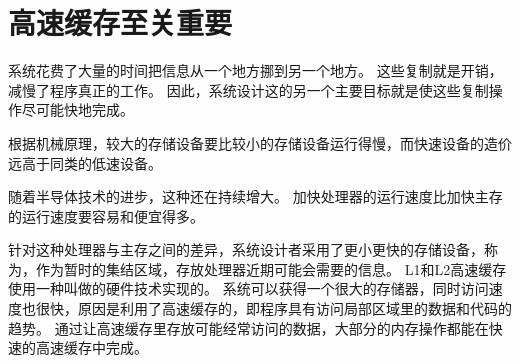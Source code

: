 
\section{高速缓存至关重要}
{
    系统花费了大量的时间把信息从一个地方挪到另一个地方。
    这些复制就是开销，减慢了程序真正的工作。
    因此，系统设计这的另一个主要目标就是使这些复制操作尽可能快地完成。

    根据机械原理，较大的存储设备要比较小的存储设备运行得慢，而快速设备的造价远高于同类的低速设备。

    随着半导体技术的进步，这种还在持续增大。
    加快处理器的运行速度比加快主存的运行速度要容易和便宜得多。

    针对这种处理器与主存之间的差异，系统设计者采用了更小更快的存储设备，称为，作为暂时的集结区域，存放处理器近期可能会需要的信息。
    L1和L2高速缓存使用一种叫做的硬件技术实现的。
    系统可以获得一个很大的存储器，同时访问速度也很快，原因是利用了高速缓存的，即程序具有访问局部区域里的数据和代码的趋势。
    通过让高速缓存里存放可能经常访问的数据，大部分的内存操作都能在快速的高速缓存中完成。
}

